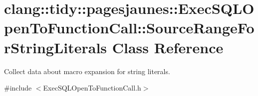 \hypertarget{classclang_1_1tidy_1_1pagesjaunes_1_1_exec_s_q_l_open_to_function_call_1_1_source_range_for_string_literals}{}\section{clang\+:\+:tidy\+:\+:pagesjaunes\+:\+:Exec\+S\+Q\+L\+Open\+To\+Function\+Call\+:\+:Source\+Range\+For\+String\+Literals Class Reference}
\label{classclang_1_1tidy_1_1pagesjaunes_1_1_exec_s_q_l_open_to_function_call_1_1_source_range_for_string_literals}


Collect data about macro expansion for string literals.  




{\ttfamily \#include $<$Exec\+S\+Q\+L\+Open\+To\+Function\+Call.\+h$>$}


